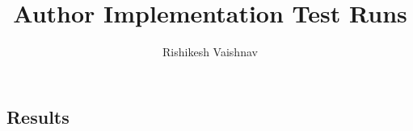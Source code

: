 \documentclass[a4paper]{article}
\title{Author Implementation Test Runs}
\author{Rishikesh Vaishnav}
\begin{document}
\maketitle
\subsection*{Results}
\begin{centering}
\scalebox{0.6}{}\\
\scalebox{0.6}{}\\
\scalebox{0.6}{}\\
\scalebox{0.6}{}\\
\scalebox{0.6}{}\\
\scalebox{0.6}{}\\
\scalebox{0.6}{}\\
\end{centering}
\end{document}
